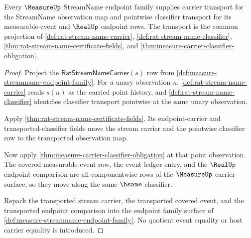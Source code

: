 \begin{theorem}
\label{thm:measure-streamname-endpoint-carrier-classifier}
Every $\MeasureUp$ StreamName endpoint family supplies carrier transport for
the StreamName observation map and pointwise classifier transport for its
measurable-event and $\RealUp$ endpoint rows. The transport is the common
projection of \autoref{def:rat-stream-name-carrier},
\autoref{def:rat-stream-name-classifier},
\autoref{thm:rat-stream-name-certificate-fields}, and
\autoref{thm:measure-carrier-classifier-obligation}.
\end{theorem}
\begin{proof}
Project the $\mathsf{RatStreamNameCarrier}(s)$ row from
\autoref{def:measure-streamname-endpoint-family}. For a unary observation
$n$, \autoref{def:rat-stream-name-carrier} reads $s(n)$ as the carried point
history, and \autoref{def:rat-stream-name-classifier} identifies classifier
transport pointwise at the same unary observation.

Apply \autoref{thm:rat-stream-name-certificate-fields}. Its endpoint-carrier
and transported-classifier fields move the stream carrier and the pointwise
classifier row to the transported observation map.

Now apply \autoref{thm:measure-carrier-classifier-obligation} at that point
observation. The covered measurable-event row, the event ledger entry, and the
$\RealUp$ endpoint comparison are all componentwise rows of the
$\MeasureUp$ carrier surface, so they move along the same $\hsame$
classifier.

Repack the transported stream carrier, the transported covered event, and the
transported endpoint comparison into the endpoint family surface of
\autoref{def:measure-streamname-endpoint-family}. No quotient event equality
or host carrier equality is introduced.
\end{proof}

